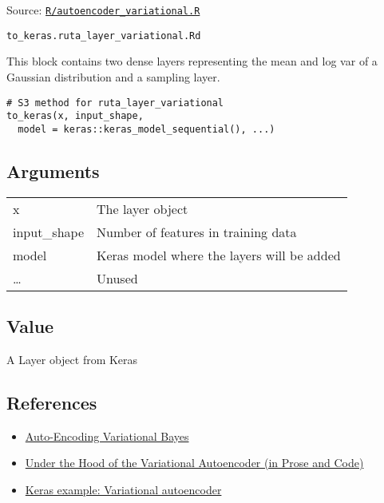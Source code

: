 Source:
\href{https://github.com/fdavidcl/ruta/blob/master/R/autoencoder_variational.R}{\texttt{R/autoencoder\_variational.R}}

\texttt{to\_keras.ruta\_layer\_variational.Rd}

This block contains two dense layers representing the mean and log var
of a Gaussian distribution and a sampling layer.

\begin{verbatim}
# S3 method for ruta_layer_variational
to_keras(x, input_shape,
  model = keras::keras_model_sequential(), ...)
\end{verbatim}

\hypertarget{arguments}{\subsection{\texorpdfstring{\protect\hyperlink{arguments}{}Arguments}{Arguments}}\label{arguments}}

\begin{longtable}[c]{@{}ll@{}}
\toprule
x & The layer object\tabularnewline
input\_shape & Number of features in training data\tabularnewline
model & Keras model where the layers will be added\tabularnewline
\ldots{} & Unused\tabularnewline
\bottomrule
\end{longtable}

\hypertarget{value}{\subsection{\texorpdfstring{\protect\hyperlink{value}{}Value}{Value}}\label{value}}

A Layer object from Keras

\hypertarget{references}{\subsection{\texorpdfstring{\protect\hyperlink{references}{}References}{References}}\label{references}}

\begin{itemize}
\item
  \href{https://arxiv.org/abs/1312.6114}{Auto-Encoding Variational
  Bayes}
\item
  \href{http://blog.fastforwardlabs.com/2016/08/22/under-the-hood-of-the-variational-autoencoder-in.html}{Under
  the Hood of the Variational Autoencoder (in Prose and Code)}
\item
  \href{https://keras.rstudio.com/articles/examples/variational_autoencoder.html}{Keras
  example: Variational autoencoder}
\end{itemize}


